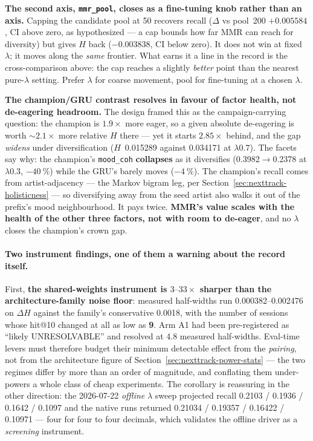 \documentclass[11pt]{article}
\begin{document}
\textbf{The second axis, \texttt{mmr\_pool}, closes as a fine-tuning knob rather
than an axis.} Capping the candidate pool at \num{50} recovers recall
($\Delta$ vs pool~\num{200} $+\num{0.005584}$, CI above zero, as hypothesized ---
a cap bounds how far MMR can reach for diversity) but gives $H$ back
($-\num{0.003838}$, CI below zero). It does not win at fixed $\lambda$; it moves
along the \emph{same} frontier. What earns it a line in the record is the
cross-comparison above: the cap reaches a slightly \emph{better} point than the
nearest pure-$\lambda$ setting. Prefer $\lambda$ for coarse movement, pool for
fine-tuning at a chosen $\lambda$.

\textbf{The champion/GRU contrast resolves in favour of factor health, not
de-eagering headroom.} The design framed this as the campaign-carrying question:
the champion is $\num{1.9}\times$ more eager, so a given absolute de-eagering is
worth ${\sim}\num{2.1}\times$ more relative $H$ there --- yet it starts
$\num{2.85}\times$ behind, and the gap \emph{widens} under diversification
($H$~\num{0.015289} against \num{0.034171} at $\lambda\num{0.7}$). The facets say
why: the champion's \texttt{mood\_coh} \textbf{collapses} as it diversifies
(\num{0.3982}$\to$\num{0.2378} at $\lambda\num{0.3}$, $-\SI{40}{\percent}$) while
the GRU's barely moves ($-\SI{4}{\percent}$). The champion's recall comes from
artist-adjacency --- the Markov bigram leg, per
Section~\ref{sec:nexttrack-holisticness} --- so diversifying away from the seed artist also
walks it out of the prefix's mood neighbourhood. It pays twice. \textbf{MMR's
value scales with the health of the other three factors, not with room to
de-eager}, and no $\lambda$ closes the champion's crown gap.

\paragraph{Two instrument findings, one of them a warning about the record
itself.} First, \textbf{the shared-weights instrument is
$\numrange{3}{33}\times$ sharper than the architecture-family noise floor}:
measured half-widths run \numrange{0.000382}{0.002476} on $\Delta H$ against the
family's conservative \num{0.0018}, with the number of sessions whose hit@10
changed at all as low as \textbf{\num{9}}. Arm A1 had been pre-registered as
``likely UNRESOLVABLE'' and resolved at \num{4.8} measured half-widths.
Eval-time levers must therefore budget their minimum detectable effect from the
\emph{pairing}, not from the architecture figure of
Section~\ref{sec:nexttrack-power-stats} --- the two regimes differ by more than an order of
magnitude, and conflating them under-powers a whole class of cheap experiments.
The corollary is reassuring in the other direction: the 2026-07-22 \emph{offline}
$\lambda$ sweep projected recall \num{0.2103} / \num{0.1936} / \num{0.1642} /
\num{0.1097} and the native runs returned \num{0.21034} / \num{0.19357} /
\num{0.16422} / \num{0.10971} --- four for four to four decimals, which validates
the offline driver as a \emph{screening} instrument.
\end{document}
